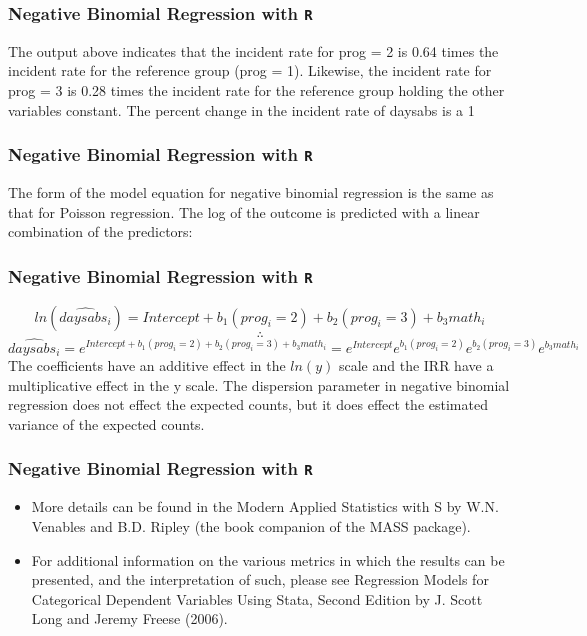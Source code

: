 \documentclass[00-GLMregslides.tex]{subfiles}
\begin{document}
\begin{frame}[fragile]
	\frametitle{Negative Binomial Regression with \texttt{R} }
	\Large
	
	The output above indicates that the incident rate for prog = 2 is 0.64 times the incident rate for the reference group (prog = 1). Likewise, the incident rate for prog = 3 is 0.28 times the incident rate for the reference group holding the other variables constant. The percent change in the incident rate of daysabs is a 1%
\end{frame}
\begin{frame}[fragile]
	\frametitle{Negative Binomial Regression with \texttt{R} }
	\Large
	
	The form of the model equation for negative binomial regression is the same as that for Poisson regression. The log of the outcome is predicted with a linear combination of the predictors:
\end{frame}
\begin{frame}[fragile]
	\frametitle{Negative Binomial Regression with \texttt{R} }
	\Large
	
	\[ ln(\widehat{daysabs_i}) = Intercept + b_1(prog_i = 2) + b_2(prog_i = 3) + b_3math_i \] \[ \therefore \] \[ \widehat{daysabs_i} = e^{Intercept + b_1(prog_i = 2) + b_2(prog_i = 3) + b_3math_i} = e^{Intercept}e^{b_1(prog_i = 2)}e^{b_2(prog_i = 3)}e^{b_3math_i} \]
	The coefficients have an additive effect in the \(ln(y)\) scale and the IRR have a multiplicative effect 
	in the y scale. The dispersion parameter in negative binomial regression does not effect the expected counts, 
	but it does effect the estimated variance of the expected counts. 
	\end{frame}
\begin{frame}[fragile]
	\frametitle{Negative Binomial Regression with \texttt{R} }
	\Large
	\begin{itemize}
\item More details can be found in the Modern Applied Statistics with S by W.N. Venables and B.D. Ripley (the book companion of the MASS package).

\item 	For additional information on the various metrics in which the results can be presented, and the interpretation of such, please see Regression Models for Categorical Dependent Variables Using Stata, Second Edition by J. Scott Long and Jeremy Freese (2006).
\end{itemize}
\end{frame}
\end{document}
